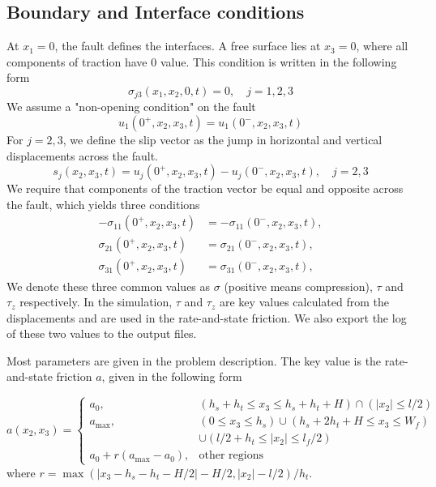\subsection{Boundary and Interface conditions}
At $x_1 = 0$, the fault defines the interfaces.
A free surface lies at $x_3 = 0$, where all components of traction have $0$ value.
This condition is written in the following form
\begin{equation}
    \sigma_{j3}(x_1, x_2, 0, t) = 0,\quad j = 1,2,3
\end{equation}
We assume a "non-opening condition" on the fault
\begin{equation}
    u_1(0^+, x_2, x_3, t) = u_1(0^-, x_2, x_3, t)
\end{equation}
For $j=2,3$, we define the slip vector as the jump in horizontal and vertical displacements across the fault.
\begin{equation}
    s_j(x_2, x_3, t) = u_j(0^+, x_2, x_3, t) - u_j(0^-, x_2, x_3, t),\quad j = 2,3
\end{equation}
We require that components of the traction vector be equal and opposite across the fault, which yields three conditions
\begin{align}
    -\sigma_{11} \left(0^+, x_2, x_3, t\right) &= -\sigma_{11} \left(0^-, x_2, x_3, t\right), \\
    \sigma_{21} \left(0^+, x_2, x_3, t\right) &= \sigma_{21} \left(0^-, x_2, x_3, t\right), \\
    \sigma_{31} \left(0^+, x_2, x_3, t\right) &= \sigma_{31} \left(0^-, x_2, x_3, t\right),
\end{align}
We denote these three common values as $\sigma$ (positive means compression), $\tau$ and $\tau_z$ respectively. 
In the simulation, $\tau$ and $\tau_z$ are key values calculated from the displacements and are used in the rate-and-state friction.
We also export the log of these two values to the output files.

Most parameters are given in the problem description. The key value is the rate-and-state friction $a$, given in the following form

\begin{equation}
    a(x_2, x_3) =
\begin{cases} 
a_0, & (h_s + h_t \leq x_3 \leq h_s + h_t + H) \cap (|x_2| \leq l/2) \\
a_{\text{max}}, & (0 \leq x_3 \leq h_s) \cup (h_s + 2h_t + H \leq x_3 \leq W_f) \\ & \cup (l/2 + h_t \leq |x_2| \leq l_f/2) \\
a_0 + r(a_{\text{max}} - a_0), & \text{other regions}
\end{cases}
\end{equation}
where $r = \max(|x_3 - h_s - h_t - H/2| - H/2, |x_2| - l/2)/h_t$.


